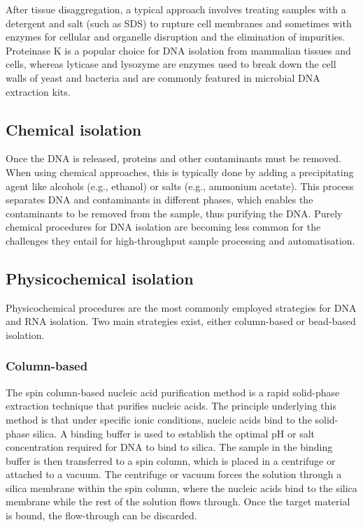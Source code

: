 \documentclass[
]{book}
\begin{document}
After tissue disaggregation, a typical approach involves treating samples with a detergent and salt (such as SDS) to rupture cell membranes and sometimes with enzymes for cellular and organelle disruption and the elimination of impurities. Proteinase K is a popular choice for DNA isolation from mammalian tissues and cells, whereas lyticase and lysozyme are enzymes used to break down the cell walls of yeast and bacteria and are commonly featured in microbial DNA extraction kits.

\hypertarget{chemical-isolation}{%
\subsection*{Chemical isolation}\label{chemical-isolation}}

Once the DNA is released, proteins and other contaminants must be removed. When using chemical approaches, this is typically done by adding a precipitating agent like alcohols (e.g., ethanol) or salts (e.g., ammonium acetate). This process separates DNA and contaminants in different phases, which enables the contaminants to be removed from the sample, thus purifying the DNA. Purely chemical procedures for DNA isolation are becoming less common for the challenges they entail for high-throughput sample processing and automatisation.

\hypertarget{physicochemical-isolation}{%
\subsection*{Physicochemical isolation}\label{physicochemical-isolation}}

Physicochemical procedures are the most commonly employed strategies for DNA and RNA isolation. Two main strategies exist, either column-based or bead-based isolation.

\hypertarget{column-based}{%
\subsubsection*{Column-based}\label{column-based}}

The spin column-based nucleic acid purification method is a rapid solid-phase extraction technique that purifies nucleic acids. The principle underlying this method is that under specific ionic conditions, nucleic acids bind to the solid-phase silica. A binding buffer is used to establish the optimal pH or salt concentration required for DNA to bind to silica. The sample in the binding buffer is then transferred to a spin column, which is placed in a centrifuge or attached to a vacuum. The centrifuge or vacuum forces the solution through a silica membrane within the spin column, where the nucleic acids bind to the silica membrane while the rest of the solution flows through. Once the target material is bound, the flow-through can be discarded.
\end{document}
